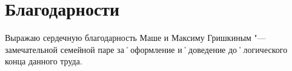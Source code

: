 ﻿\chapter{Благодарности}
Выражаю сердечную благодарность Маше и Максиму Гришкиным "--- замечательной семейной паре за˚оформление и˚доведение до˚логического конца данного труда.